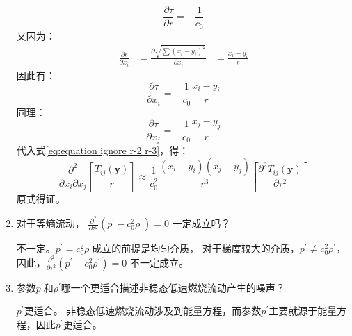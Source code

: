 \begin{enumerate}
\begin{equation}
            \frac{\partial \tau}{\partial r}
            = - \frac{1}{c_{0}}
        \end{equation}
        又因为：
        \begin{equation}
            \begin{aligned}
                \frac{\partial r}{\partial x_{i}}
                &= \frac{\partial \sqrt{ \sum \left(x_{i}-y_{i}\right)^{2}}}{\partial x_{i}}
                &= \frac{x_{i} - y_{i}}{r}
            \end{aligned}
        \end{equation}
        因此有：
        \begin{equation}
            \frac{\partial \tau}{\partial x_{i}}
            = - \frac{1}{c_{0}} \frac{x_{i} - y_{i}}{r}
        \end{equation}
        同理：
        \begin{equation}
            \frac{\partial \tau}{\partial x_{j}}
            = - \frac{1}{c_{0}} \frac{x_{j} - y_{j}}{r}
        \end{equation}
        代入式\eqref{eq:equation ignore r-2 r-3}，得：
        \begin{equation}
            \frac{\partial^{2}}{\partial x_{i} \partial x_{j}}\left[\frac{T_{i j}(\boldsymbol{y})}{r}\right] 
            \approx \frac{1}{c_{0}^{2}} \frac{\left(x_{i}-y_{i}\right)\left(x_{j}-y_{j}\right)}{r^{3}}\left[\frac{\partial^{2} T_{i j}(\boldsymbol{y})}{\partial \tau^{2}}\right]
        \end{equation}
        原式得证。

    \clearpage

    \item 对于等熵流动，
    \(\frac{\partial^{2}}{\partial \tau^{2}}\left(p^{\prime}-c_{0}^{2} \rho^{\prime}\right)=0\)
    一定成立吗？
    
        不一定。\( p^{\prime} = c_{0}^{2} \rho^{\prime} \)成立的前提是均匀介质，
        对于梯度较大的介质，\( p^{\prime} \neq  c_{0}^{2} \rho^{\prime} \)，
        因此，\(\frac{\partial^{2}}{\partial \tau^{2}}\left(p^{\prime}-c_{0}^{2} \rho^{\prime}\right)=0\) 不一定成立。

        
    \item 参数\(p^{\prime}\)和\(\rho^{\prime}\)哪一个更适合描述非稳态低速燃烧流动产生的噪声？
        
        \(p^{\prime}\)更适合。
        非稳态低速燃烧流动涉及到能量方程，而参数\(p^{\prime}\)主要就源于能量方程，因此\(p^{\prime}\)更适合。
\end{enumerate}

\clearpage